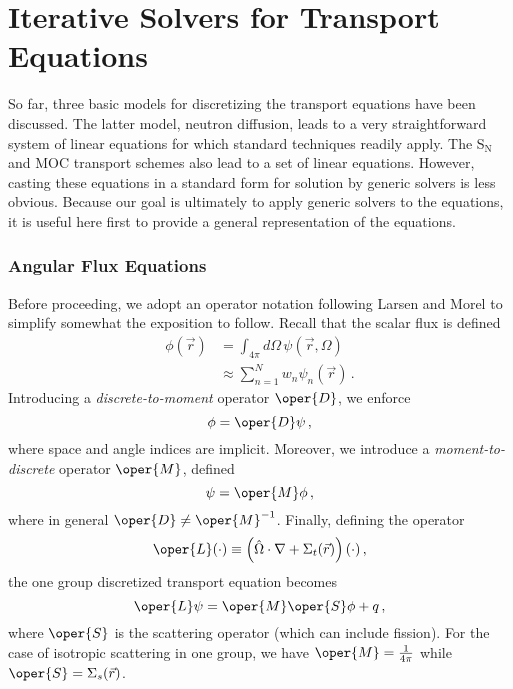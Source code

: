 \chapter{Iterative Solvers for Transport Equations}
\label{lec:iterative_solvers}

So far, three basic models for discretizing the transport equations have been
discussed.  The latter model, neutron diffusion, leads to a very 
straightforward system of linear equations for which standard techniques
readily apply.  The S$_{\text{N}}$ and MOC transport schemes also lead 
to a set of linear equations.  However, casting these equations in a 
standard form for solution by generic solvers is less obvious.   Because
our goal is ultimately to apply generic solvers to the equations, it
is useful here first to provide a general representation of the equations.

\subsection{Angular Flux Equations}

Before proceeding, we adopt an operator notation following Larsen 
and Morel \cite{larsen2010ado} to simplify
somewhat the exposition to follow.  
Recall that the scalar flux is defined
\begin{equation}
\begin{split}
  \phi(\vec{r}) &= \int_{4\pi} d \Omega \, 
                   \psi(\vec{r}, \Omega) \\
              &\approx \sum_{n = 1}^N w_n \psi_{n}(\vec{r}) \, .
\end{split}
\end{equation}
Introducing a \emph{discrete-to-moment} operator $\oper{D}$, we
enforce
\begin{equation}
 \phi = \oper{D} \psi \, ,
\end{equation}
where space and angle indices are implicit.  Moreover, we introduce
a \emph{moment-to-discrete} operator $\oper{M}$, defined
\begin{equation}
 \psi = \oper{M} \phi \, ,
\end{equation}
where in general
$\oper{D} \ne \oper{M}^{-1}$.  Finally,
defining the operator
\begin{equation}
 \oper{L} (\cdot) \equiv 
 \left ( \hat{\Omega} \cdot \nabla + 
   \Sigma_{t}(\vec{r}) \right ) (\cdot) \, ,
\end{equation}
the one group discretized transport equation becomes
\begin{equation}
  \oper{L}\psi = \oper{M}\oper{S}\phi + q \, ,
\label{eq:wgteop_psi}
\end{equation}
where $\oper{S}$ is the scattering operator (which can include
fission).  For the case of
isotropic scattering in one group, we have
$\oper{M} = \frac{1}{4\pi}$
while $\oper{S} = \Sigma_s(\vec{r})$.

